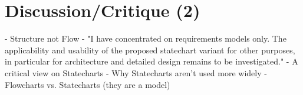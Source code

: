 \chapter{Discussion/Critique (2)}
- Structure not Flow \autocite{melia_comparison_2016}
- "I have concentrated on requirements models only. The applicability and usability of the proposed statechart variant for other purposes, in particular for architecture and detailed design remains to be investigated." \autocite[5]{glinz_statecharts_2002}
- A critical view on Statecharts \autocite{breen_statecharts_2004}
- Why Statecharts aren't used more widely \autocite[9]{harel_statecharts_2007}
- Flowcharts vs. Statecharts (they are a model) \autocite[10]{harel_statecharts_2007}